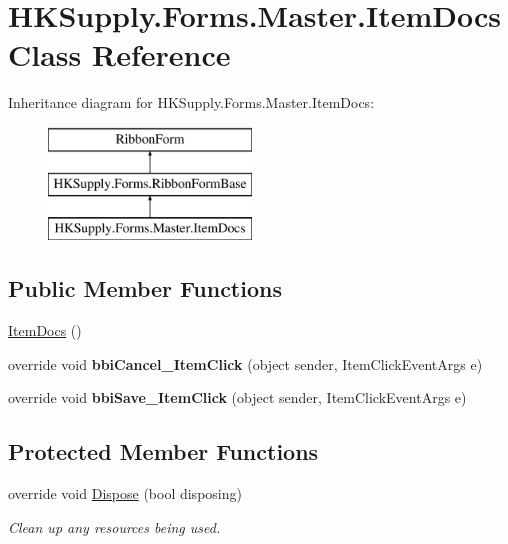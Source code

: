 \hypertarget{class_h_k_supply_1_1_forms_1_1_master_1_1_item_docs}{}\section{H\+K\+Supply.\+Forms.\+Master.\+Item\+Docs Class Reference}
\label{class_h_k_supply_1_1_forms_1_1_master_1_1_item_docs}
Inheritance diagram for H\+K\+Supply.\+Forms.\+Master.\+Item\+Docs\+:\begin{figure}[H]
\begin{center}
\leavevmode
\includegraphics[height=3.000000cm]{class_h_k_supply_1_1_forms_1_1_master_1_1_item_docs}
\end{center}
\end{figure}
\subsection*{Public Member Functions}
\begin{DoxyCompactItemize}
\item 
\mbox{\hyperlink{class_h_k_supply_1_1_forms_1_1_master_1_1_item_docs_ae5ea15c74c081b37a29eb08e3811dc68}{Item\+Docs}} ()
\item 
\mbox{\label{class_h_k_supply_1_1_forms_1_1_master_1_1_item_docs_abb22d56af1fb18a825c2770c0adf9160}} 
override void {\bfseries bbi\+Cancel\+\_\+\+Item\+Click} (object sender, Item\+Click\+Event\+Args e)
\item 
\mbox{\label{class_h_k_supply_1_1_forms_1_1_master_1_1_item_docs_a66d86ca3ec4a3b255cbd45f5383303f4}} 
override void {\bfseries bbi\+Save\+\_\+\+Item\+Click} (object sender, Item\+Click\+Event\+Args e)
\end{DoxyCompactItemize}
\subsection*{Protected Member Functions}
\begin{DoxyCompactItemize}
\item 
override void \mbox{\hyperlink{class_h_k_supply_1_1_forms_1_1_master_1_1_item_docs_acf5dfceeeafc8ca2d893ff9eecd9c943}{Dispose}} (bool disposing)
\begin{DoxyCompactList}\small\item\em Clean up any resources being used. \end{DoxyCompactList}\end{DoxyCompactItemize}
